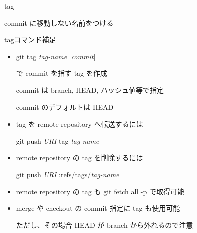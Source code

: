 
\begin{frame}[t]{tag}{}

  commit に移動しない名前をつける
  \vspace{4ex}




\end{frame}


\begin{frame}[t]{tag}{コマンド補足}

  \begin{itemize}
  \item git tag \textit{tag-name} [\textit{commit}]

    で commit を指す tag を作成

    commit は branch, HEAD, ハッシュ値等で指定

    commit のデフォルトは HEAD
    \vspace{2ex}

  \item tag を remote repository へ転送するには

    git push \textit{URI} tag \textit{tag-name}
    \vspace{2ex}

  \item remote repository の tag を削除するには

    git push \textit{URI} :refs/tags/\textit{tag-name}
    \vspace{2ex}

  \item remote repository の tag も git fetch {\dhyphen}all -p で取得可能
    \vspace{2ex}

  \item merge や checkout の commit 指定に tag も使用可能

    ただし、その場合 HEAD が branch から外れるので注意
  \end{itemize}

\end{frame}
